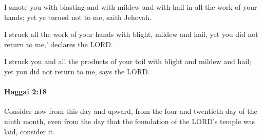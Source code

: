 			\begin{versebox}
					\item[BHS] 
					\item[LXX] 
					\item[ASV] I smote you with blasting and with mildew and with hail in all the work of your hands; yet ye turned not to me, saith Jehovah.
					\item[NIV] I struck all the work of your hands with blight, mildew and hail, yet you did not return to me,’ declares the LORD.
					\item[NRSV] I struck you and all the products of your toil with blight and mildew and hail; yet you did not return to me, says the LORD.
			\end{versebox}

		\paragraph{Haggai 2:18} %
			\label{HAGGAI-2-18}

			Consider now from this day and upward, from the four and twentieth day of the ninth month, even from the day that the foundation of the LORD’s temple was laid, consider it.

